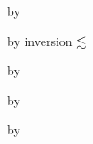 {\begin{lamportproof*}
    \begin{pfproof}
        \begin{pfproof}
          by 
        \end{pfproof}
        \begin{pfproof}
          by inversion $\lesssim$
        \end{pfproof}
      \qedstep
        \begin{pfproof}
          by 
        \end{pfproof}
    \end{pfproof}

    \begin{pfproof}
        \begin{pfproof}
          by 
        \end{pfproof}
      \qedstep
        \begin{pfproof}
          by 
        \end{pfproof}
    \end{pfproof}

\end{lamportproof*}}

